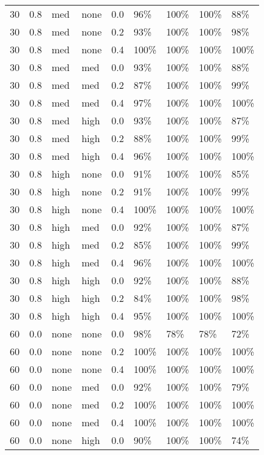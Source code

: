 \begin{longtable}{rrllrllll}
  30 & 0.8 & med & none & 0.0 & 96\% & 100\% & 100\% & 88\% \\ 
  30 & 0.8 & med & none & 0.2 & 93\% & 100\% & 100\% & 98\% \\ 
  30 & 0.8 & med & none & 0.4 & 100\% & 100\% & 100\% & 100\% \\ 
  30 & 0.8 & med & med & 0.0 & 93\% & 100\% & 100\% & 88\% \\ 
  30 & 0.8 & med & med & 0.2 & 87\% & 100\% & 100\% & 99\% \\ 
  30 & 0.8 & med & med & 0.4 & 97\% & 100\% & 100\% & 100\% \\ 
  30 & 0.8 & med & high & 0.0 & 93\% & 100\% & 100\% & 87\% \\ 
  30 & 0.8 & med & high & 0.2 & 88\% & 100\% & 100\% & 99\% \\ 
  30 & 0.8 & med & high & 0.4 & 96\% & 100\% & 100\% & 100\% \\ 
  30 & 0.8 & high & none & 0.0 & 91\% & 100\% & 100\% & 85\% \\ 
  30 & 0.8 & high & none & 0.2 & 91\% & 100\% & 100\% & 99\% \\ 
  30 & 0.8 & high & none & 0.4 & 100\% & 100\% & 100\% & 100\% \\ 
  30 & 0.8 & high & med & 0.0 & 92\% & 100\% & 100\% & 87\% \\ 
  30 & 0.8 & high & med & 0.2 & 85\% & 100\% & 100\% & 99\% \\ 
  30 & 0.8 & high & med & 0.4 & 96\% & 100\% & 100\% & 100\% \\ 
  30 & 0.8 & high & high & 0.0 & 92\% & 100\% & 100\% & 88\% \\ 
  30 & 0.8 & high & high & 0.2 & 84\% & 100\% & 100\% & 98\% \\ 
  30 & 0.8 & high & high & 0.4 & 95\% & 100\% & 100\% & 100\% \\ 
  60 & 0.0 & none & none & 0.0 & 98\% & 78\% & 78\% & 72\% \\ 
  60 & 0.0 & none & none & 0.2 & 100\% & 100\% & 100\% & 100\% \\ 
  60 & 0.0 & none & none & 0.4 & 100\% & 100\% & 100\% & 100\% \\ 
  60 & 0.0 & none & med & 0.0 & 92\% & 100\% & 100\% & 79\% \\ 
  60 & 0.0 & none & med & 0.2 & 100\% & 100\% & 100\% & 100\% \\ 
  60 & 0.0 & none & med & 0.4 & 100\% & 100\% & 100\% & 100\% \\ 
  60 & 0.0 & none & high & 0.0 & 90\% & 100\% & 100\% & 74\% \\ 

\end{longtable}
